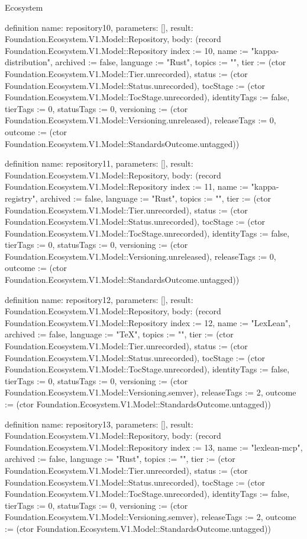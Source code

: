 \begin{lexlean}{Ecosystem}
\begin{semanticmodule}
definition{
  name: repository10,
  parameters: [],
  result: Foundation.Ecosystem.V1.Model::Repository,
  body: (record Foundation.Ecosystem.V1.Model::Repository {index := 10, name := "kappa-distribution", archived := false, language := "Rust", topics := "", tier := (ctor Foundation.Ecosystem.V1.Model::Tier.unrecorded), status := (ctor Foundation.Ecosystem.V1.Model::Status.unrecorded), tocStage := (ctor Foundation.Ecosystem.V1.Model::TocStage.unrecorded), identityTags := false, tierTags := 0, statusTags := 0, versioning := (ctor Foundation.Ecosystem.V1.Model::Versioning.unreleased), releaseTags := 0, outcome := (ctor Foundation.Ecosystem.V1.Model::StandardsOutcome.untagged)})
}

definition{
  name: repository11,
  parameters: [],
  result: Foundation.Ecosystem.V1.Model::Repository,
  body: (record Foundation.Ecosystem.V1.Model::Repository {index := 11, name := "kappa-registry", archived := false, language := "Rust", topics := "", tier := (ctor Foundation.Ecosystem.V1.Model::Tier.unrecorded), status := (ctor Foundation.Ecosystem.V1.Model::Status.unrecorded), tocStage := (ctor Foundation.Ecosystem.V1.Model::TocStage.unrecorded), identityTags := false, tierTags := 0, statusTags := 0, versioning := (ctor Foundation.Ecosystem.V1.Model::Versioning.unreleased), releaseTags := 0, outcome := (ctor Foundation.Ecosystem.V1.Model::StandardsOutcome.untagged)})
}

definition{
  name: repository12,
  parameters: [],
  result: Foundation.Ecosystem.V1.Model::Repository,
  body: (record Foundation.Ecosystem.V1.Model::Repository {index := 12, name := "LexLean", archived := false, language := "TeX", topics := "", tier := (ctor Foundation.Ecosystem.V1.Model::Tier.unrecorded), status := (ctor Foundation.Ecosystem.V1.Model::Status.unrecorded), tocStage := (ctor Foundation.Ecosystem.V1.Model::TocStage.unrecorded), identityTags := false, tierTags := 0, statusTags := 0, versioning := (ctor Foundation.Ecosystem.V1.Model::Versioning.semver), releaseTags := 2, outcome := (ctor Foundation.Ecosystem.V1.Model::StandardsOutcome.untagged)})
}

definition{
  name: repository13,
  parameters: [],
  result: Foundation.Ecosystem.V1.Model::Repository,
  body: (record Foundation.Ecosystem.V1.Model::Repository {index := 13, name := "lexlean-mcp", archived := false, language := "Rust", topics := "", tier := (ctor Foundation.Ecosystem.V1.Model::Tier.unrecorded), status := (ctor Foundation.Ecosystem.V1.Model::Status.unrecorded), tocStage := (ctor Foundation.Ecosystem.V1.Model::TocStage.unrecorded), identityTags := false, tierTags := 0, statusTags := 0, versioning := (ctor Foundation.Ecosystem.V1.Model::Versioning.semver), releaseTags := 2, outcome := (ctor Foundation.Ecosystem.V1.Model::StandardsOutcome.untagged)})
}


\end{semanticmodule}
\end{lexlean}
